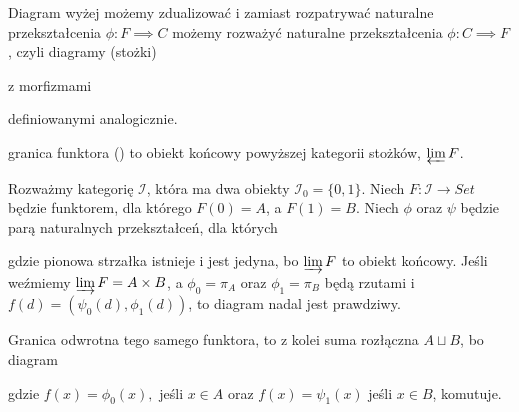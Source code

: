 Diagram wyżej możemy zdualizować i zamiast rozpatrywać naturalne przekształcenia $\phi:F\implies C$ możemy rozważyć naturalne przekształcenia $\phi:C\implies F$, czyli diagramy (stożki)
\begin{center}
\end{center}
z morfizmami {definiowanymi analogicznie. 

\begin{definition}{granica funktora}{}
   () to obiekt końcowy powyższej kategorii stożków, $\varprojlim F$.
\end{definition}

%
%
%
Rozważmy kategorię $\mathcal{I}$, która ma dwa obiekty $\mathcal{I}_0=\{0,1\}$. Niech $F:\mathcal{I}\to Set$ będzie funktorem, dla którego $F(0)=A$, a $F(1)=B$. Niech $\phi$ oraz $\psi$ będzie parą naturalnych przekształceń, dla których
\begin{center}
\end{center}
gdzie pionowa strzałka istnieje i jest jedyna, bo $\varinjlim F$ to obiekt końcowy. Jeśli weźmiemy $\varinjlim F=A\times B$, a $\phi_0=\pi_A$ oraz $\phi_1=\pi_B$ będą rzutami i $f(d)=(\psi_0(d), \phi_1(d))$, to diagram nadal jest prawdziwy. 

Granica odwrotna tego samego funktora, to z kolei suma rozłączna $A\sqcup B$, bo diagram
\begin{center}
\end{center}
gdzie $f(x)=\phi_0(x),$ jeśli $x\in A$ oraz $f(x)=\psi_1(x)$ jeśli $x\in B$, komutuje.

}
